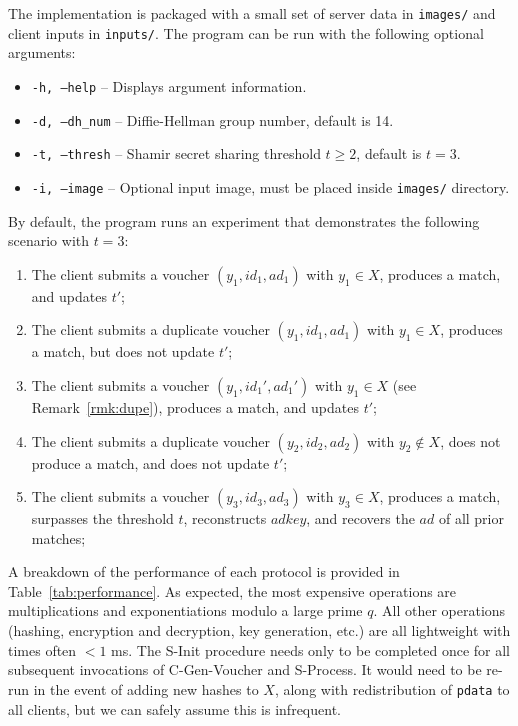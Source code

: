 The implementation is packaged with a small set of server data in \texttt{images/} and client inputs in \texttt{inputs/}. The program can be run with the following optional arguments:
\begin{itemize}
	\item \texttt{-h, --help} -- Displays argument information.
	\item \texttt{-d, --dh_num} -- Diffie-Hellman group number, default is 14.
	\item \texttt{-t, --thresh} -- Shamir secret sharing threshold $t \geq 2 $, default is $t = 3$.
	\item \texttt{-i, --image} -- Optional input image, must be placed inside \texttt{images/} directory.
\end{itemize}
By default, the program runs an experiment that demonstrates the following scenario with $t = 3$:
\begin{enumerate}{}
	\item The client submits a voucher $(y_1, id_1, ad_1)$ with $y_1 \in X$, produces a match, and updates $t'$;
	\item The client submits a duplicate voucher  $(y_1, id_1, ad_1)$ with $y_1 \in X$, produces a match, but does not update $t'$;
	\item The client submits a voucher  $(y_1, id_1', ad_1')$ with $y_1 \in X$ (see Remark~\ref{rmk:dupe}), produces a match, and updates $t'$;
	\item The client submits a duplicate voucher  $(y_2, id_2, ad_2)$ with $y_2 \nin X$, does not produce a match, and does not update $t'$;
	\item The client submits a voucher $(y_3, id_3, ad_3)$ with $y_3 \in X$, produces a match, surpasses the threshold $t$, reconstructs $adkey$, and recovers the $ad$ of all prior matches;
\end{enumerate}

A breakdown of the performance of each protocol is provided in Table~\ref{tab:performance}. As expected, the most expensive operations are multiplications and exponentiations modulo a large prime $q$. All other operations (hashing, encryption and decryption, key generation, etc.) are all lightweight with times often $<1$ ms. The {\sf S-Init} procedure needs only to be completed once for all subsequent invocations of {\sf C-Gen-Voucher} and {\sf S-Process}. It would need to be re-run in the event of adding new hashes to $X$, along with redistribution of \texttt{pdata} to all clients, but we can safely assume this is infrequent.

